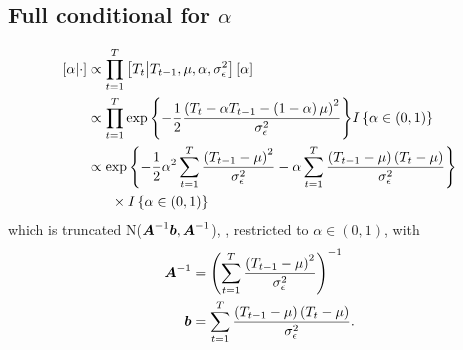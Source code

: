 \documentclass{article}\usepackage[]{graphicx}\usepackage[]{color}
\def\bm#1{\mbox{\boldmath $#1$}}
\begin{document}
\subsection{Full conditional for $\alpha$}
%
\begin{align*}
%
\left[ \alpha \middle| \cdot \right] & \propto \prod_{t = 1}^T \left[ T_t \middle| T_{t - 1}, \mu, \alpha, \sigma^2_\epsilon \right] \left[ \alpha \right]\\
%
& \propto \prod_{t = 1}^T \exp{ \left\{ - \frac{1} {2} \frac{\left( T_t  - \alpha T_{t - 1} - \left( 1 - \alpha \right) \mu \right)^2} {\sigma^2_\epsilon} \right\} } I \left\{ \alpha \in \left( 0, 1 \right) \right\}\\
%
& \propto \exp{ \left\{ - \frac{1} {2} \alpha^2 \sum_{t = 1}^T \frac{\left( T_{t - 1} - \mu \right)^2} {\sigma^2_\epsilon} - \alpha \sum_{t = 1}^T \frac{\left( T_{t - 1} - \mu \right) \left( T_t - \mu \right) } {\sigma^2_\epsilon} \right\} } \\
& \hspace{6mm} \times I \left\{ \alpha \in \left( 0, 1 \right) \right\}\\
%
\end{align*}
%
which is truncated N($\bm{A}^{ - 1}\bm{b}, \bm{A}^{ - 1}$), , restricted to $\alpha \in \left( 0, 1 \right)$,  with \\
\begin{align*}
%
\bm{A}^{ - 1} & = \left( \sum_{t = 1}^T \frac{\left( T_{t - 1} - \mu \right)^2} {\sigma^2_\epsilon} \right)^{ - 1}\\
%
\bm{b} & = \sum_{t = 1}^T \frac{\left( T_{t - 1} - \mu \right) \left( T_t - \mu \right) } {\sigma^2_\epsilon}.
%
\end{align*}
%
%
\end{document}
